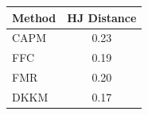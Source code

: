 \begin{tabular}{l c}
\toprule
Method & HJ Distance \\
\midrule
CAPM & 0.23 \\
FFC & 0.19 \\
FMR & 0.20 \\
DKKM & 0.17 \\
\bottomrule
\end{tabular}